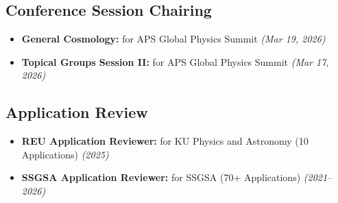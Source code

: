 \documentclass[10pt,letterpaper]{report}
\newcommand{\cvdate}[1]{{\normalfont\itshape\color{Muted}(#1)}}
\begin{document}
\subsection*{Conference Session Chairing}
\begin{itemize}

    \item {\bf General Cosmology:} for APS Global Physics Summit \cvdate{Mar 19, 2026}
\item {\bf Topical Groups Session II:} for APS Global Physics Summit \cvdate{Mar 17, 2026}

\end{itemize}

\subsection*{Application Review}
\begin{itemize}

    \item {\bf REU Application Reviewer:} for KU Physics and Astronomy (10 Applications) \cvdate{2025}
\item {\bf SSGSA Application Reviewer:} for SSGSA (70+ Applications) \cvdate{2021--2026}

\end{itemize}


\end{document}
